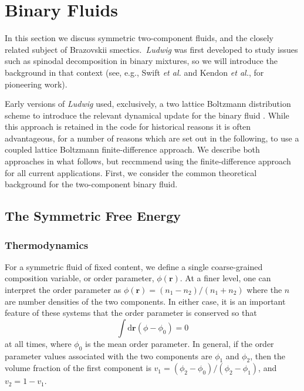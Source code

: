 %
%
%
%
%
%

\section{Binary Fluids}

In this section we discuss symmetric two-component fluids, and the closely
related subject of Brazovskii smectics.\ \textit{Ludwig} was first developed
to study issues such as spinodal decomposition in binary mixtures,
so we will introduce the background in that
context (see, e.g., Swift \textit{et al.} \cite{swift1996} and Kendon
\textit{et al.}, \cite{kendon2001} for pioneering work).

Early versions of \textit{Ludwig} used, exclusively, a two lattice
Boltzmann distribution scheme to introduce the relevant dynamical update
for the binary fluid \cite{desplat2001}.
While this approach is retained in the code
for historical reasons it is often advantageous, for a number of reasons
which are set out in the following, to use a coupled lattice
Boltzmann finite-difference approach. We describe both approaches in what
follows, but reccmmend using the finite-difference approach for all current
applications. First, we consider
the common theoretical background for the two-component binary fluid.


\subsection{The Symmetric Free Energy}

\subsubsection{Thermodynamics}

For a symmetric fluid of fixed content, we define a single coarse-grained
composition
variable, or order parameter, $\phi(\mathbf{r})$. At a finer level,
one can interpret the order parameter as
$\phi(\mathbf{r}) = (n_1 - n_2)/(n_1 + n_2)$
where the $n$ are number densities of the two components. In either case,
it is an important
feature of these systems that the order parameter is conserved so that
\begin{equation}
\int \mathrm{d}\mathbf{r} (\phi - \phi_0) = 0
\end{equation}
at all times, where $\phi_0$ is the mean order parameter. In general,
if the order parameter values associated with the two components are
$\phi_1$ and $\phi_2$, then the volume fraction of the first component is
$v_1 = (\phi_2 - \phi_0)/(\phi_2 - \phi_1)$, and $v_2 = 1 - v_1$.

